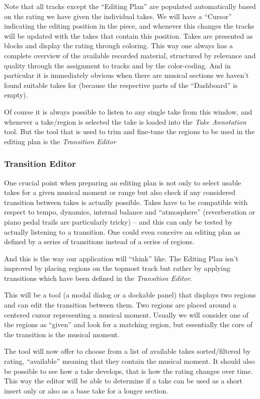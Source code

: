 \documentclass[11pt,a4paper]{article}
\begin{document}
Note that all tracks except the “Editing Plan” are populated automatically based on the rating we have given the individual takes.
We will have a “Cursor” indicating the editing position in the piece, and whenever this changes the tracks will be updated with the takes that contain this position.
Takes are presented as blocks and display the rating through coloring.
This way one always has a complete overview of the available recorded material, structured by relevance and quality through the assignment to tracks and by the color-coding.
And in particular it is immediately obvious when there are musical sections we haven't found suitable takes for (because the respective parts of the “Dashboard” is empty).

Of course it is always possible to listen to any single take from this window, and whenever a take/region is selected the take is loaded into the \emph{Take Annotation} tool.
But the tool that is used to trim and fine-tune the regions to be used in the editing plan is the \emph{Transition Editor}

\subsubsection{Transition Editor}

One crucial point when preparing an editing plan is not only to select usable takes for a given musical moment or range but also check if any considered transition between takes is actually possible.
Takes have to be compatible with respect to tempo, dynamics, internal balance and “atmosphere” (reverberation or piano pedal trails are particularly tricky) -- and this can only be tested by actually listening to a transition.
One could even conceive an editing plan as defined by a series of transitions instead of a series of regions.

And this is the way our application will “think” like.
The Editing Plan isn't improved by placing regions on the topmost track but rather by applying transitions which have been defined in the \emph{Transition Editor}.

This will be a tool (a modal dialog or a dockable panel) that displays two regions and can edit the transition between them.
Two regions are placed around a centered cursor representing a musical moment.
Usually we will consider one of the regions as “given” and look for a matching region, but essentially the core of the transition is the musical moment.

The tool will now offer to choose from a list of available takes sorted/filtered by rating, “available” meaning that they contain the musical moment.
It should also be possible to see how a take develops, that is how the rating changes over time.
This way the editor will be able to determine if a take can be used as a short insert only or also as a base take for a longer section.
\end{document}
